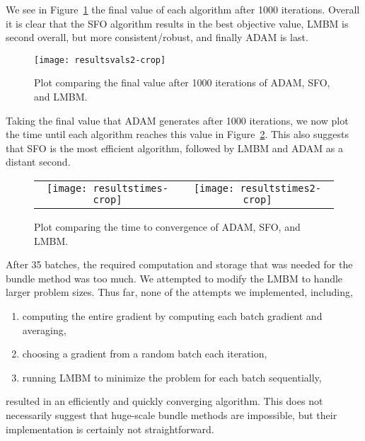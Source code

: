 \documentclass[psamsfonts,onesided,10pt]{amsart}
\theoremstyle{definition}
\theoremstyle{remark}
\numberwithin{equation}{section}
\begin{document}
We see in Figure~\ref{fig-valplot} the final value of each algorithm after 1000 iterations. Overall it is clear
that the SFO algorithm results in the best objective value, LMBM is second overall, but more consistent/robust, 
and finally ADAM is last.

\begin{figure}
\caption{\label{fig-valplot} Plot comparing the final value after 1000 iterations of ADAM, SFO, and LMBM.}
\begin{center}
\texttt{[image: resultsvals2-crop]}
\end{center}
\end{figure}

Taking the final value that ADAM generates after 1000 iterations, we now plot the time until each algorithm
reaches this value in Figure~\ref{fig-timeplot}. This also suggests that SFO is the most efficient algorithm,
followed by LMBM and ADAM as a distant second.

\begin{figure}
\caption{\label{fig-timeplot} Plot comparing the time to convergence of ADAM, SFO, and LMBM.}
\begin{center}
\begin{tabular}{c c} 
\texttt{[image: resultstimes-crop]}
&
\texttt{[image: resultstimes2-crop]}
\end{tabular}
\end{center}
\end{figure}


After 35 batches, the required computation and storage that was needed for the bundle method was too much.
We attempted to modify the LMBM to handle larger problem sizes. Thus far, none of the attempts we implemented, including,
\begin{enumerate}
\item computing the entire gradient by computing each batch gradient and averaging,
\item choosing a gradient from a random batch each iteration,
\item running LMBM to minimize the problem for each batch sequentially,
\end{enumerate}
resulted in an efficiently and quickly converging algorithm. This does not necessarily suggest that
huge-scale bundle methods are impossible, but their implementation is certainly not straightforward. 
\end{document}
